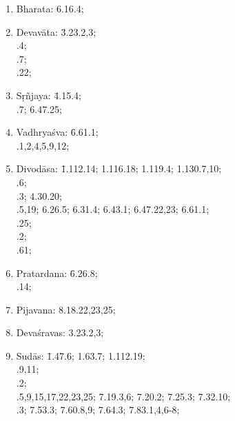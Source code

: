 \begin{enumerate}
\itemsep=0pt
\item Bharata: 6.16.4;
\item \begin{tabbing}
Devavāta: \= 3.23.2,3;\\ 
.4;\\ 
.7;\\ 
.22;
\end{tabbing}

\item \begin{tabbing}
Sṛñjaya: \= 4.15.4;\\ 
.7; 6.47.25;
\end{tabbing}

\item 
\begin{tabbing}
Vadhryaśva:  \= 6.61.1;\\ 
.1,2,4,5,9,12;
\end{tabbing}

\item 
\begin{tabbing}
Divodāsa: \= 1.112.14; 1.116.18; 1.119.4; 1.130.7,10;\\ 
.6;\\ 
.3; 4.30.20;\\ 
.5,19; 6.26.5; 6.31.4; 6.43.1; 6.47.22,23; 6.61.1;\\
.25;\\
.2;\\
.61;
\end{tabbing}

\item 
\begin{tabbing}
Pratardana: \= 6.26.8;\\ 
.14;
\end{tabbing}

\item Pijavana: 8.18.22,23,25;

\item Devaśravas: 3.23.2,3;

\item 
\begin{tabbing}
Sudās: \= 1.47.6; 1.63.7; 1.112.19;\\
.9,11;\\
.2;\\
.5,9,15,17,22,23,25; 7.19.3,6; 7.20.2; 7.25.3; 7.32.10;\\ 
.3; 7.53.3; 7.60.8,9; 7.64.3; 7.83.1,4,6-8; 
\end{tabbing}


\end{enumerate}
